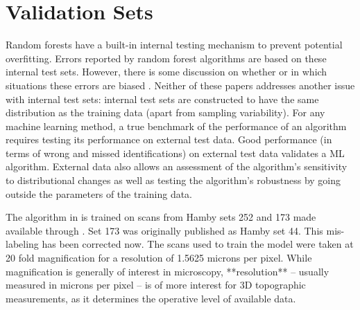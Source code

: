 \documentclass[doubleblind]{elsarticle}\usepackage[]{graphicx}\usepackage[]{color}
\begin{document}
\section{Validation Sets}

Random forests \citep{breiman} have a built-in internal testing mechanism to prevent potential overfitting. Errors reported by random forest algorithms are based on these internal test sets. However, there is some discussion on whether or in which situations these errors are biased \citep{rfOver2, rfOver}. 
Neither of these papers addresses another issue with internal test sets: internal test sets are constructed to have the same distribution as the training data (apart from sampling variability). For any machine learning method, a true benchmark of the performance of an algorithm requires testing its performance on external test data. Good performance (in terms of wrong and missed identifications) on external test data validates a ML algorithm. External data also allows an assessment of the algorithm's sensitivity to distributional changes as well as testing the algorithm's robustness by going outside the parameters of the training data.  

The algorithm in \citet{aoas2} is trained on scans from Hamby sets 252 and 173 made available through \citet{nist}. Set 173 was originally published as Hamby set 44. This mis-labeling has been corrected now. The scans used to train the model were taken at 20 fold magnification for a resolution of 1.5625 microns per pixel. While magnification is generally of interest in microscopy, **resolution** -- usually measured in microns per pixel -- is of more interest for 3D topographic measurements, as it determines the operative level of available data.
\end{document}
